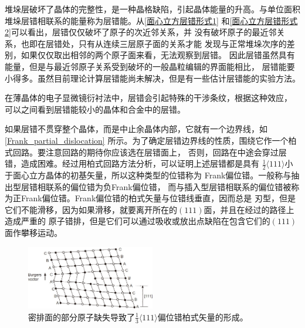                 堆垛层破坏了晶体的完整性，是一种晶格缺陷，引起晶体能量的升高。与单位面积
                堆垛层错相联系的能量称为层错能。从\autoref{面心立方层错形式1}
                和\autoref{面心立方层错形式2}可以看出，层错仅仅破坏了原子的次近邻关系，并
                没有破坏原子的最近邻关系，也即在层错处，只有从连续三层原子面的关系才能
                发现与正常堆垛次序的差别，如果仅仅取出相邻的两个原子面来看，无法观察到层错。
                因此层错虽然具有能量，但是与最近邻原子关系受到破坏的一般晶粒编辑的界面能相比，
                层错能要小得多。虽然目前理论计算层错能尚未解决，但是有一些估计层错能的实验方法。
                
                在薄晶体的电子显微镜衍衬法中，层错会引起特殊的干涉条纹，根据这种效应，
                可以之间看到层错能较小的晶体和合金中的层错。

                如果层错不贯穿整个晶体，而是中止余晶体内部，它就有一个边界线，如\autoref{Frank_partial_dislocation}
                所示。为了确定层错边界线的性质，围绕它作一个柏式回路。要注意回路的期待你应该选在层错面上，
                否则，回路在中途会穿过层错，造成困难。经过用柏式回路方法分析，可以证明上述层错都是具有 
                $\frac{1}{2}\langle 111 \rangle$小于面心立方晶体的初基矢量，所以这种类型的位错称为
                Frank偏位错。一般称与抽出型层错相联系的偏位错为负Frank偏位错，
                而与插入型层错相联系的偏位错被称为正Frank偏位错。Frank偏位错的柏式矢量与位错线垂直，因而总是
                刃型，但是它们不能滑移，因为如果滑移，就要离开所在的$(111)$面，并且在经过的路径上造成严重的
                原子错排，但是它们可以通过吸收或放出点缺陷在包含它们的$(111)$面作攀移运动。
                \begin{figure}[ht]
                    \centering
                    \includegraphics[width=0.5\textwidth]{fig/Formation_of_a_Frank_partial_dislocation.jpg}
                    \caption{密排面的部分原子缺失导致了$\frac{1}{3}\langle111\rangle$偏位错柏式矢量的形成。}
                    \label{Frank_partial_dislocation}
                \end{figure}
                
